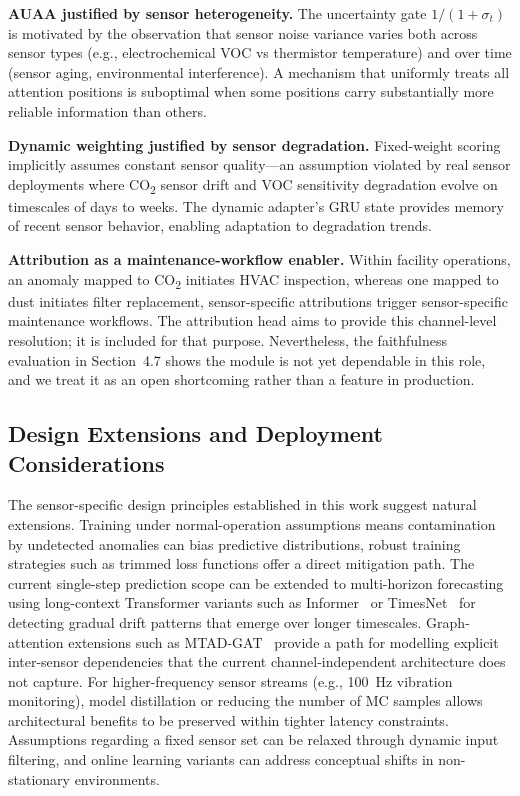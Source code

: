 \textbf{AUAA justified by sensor heterogeneity.} The uncertainty gate $1/(1 + \sigma_t)$ is motivated by the observation that sensor noise variance varies both across sensor types (e.g., electrochemical VOC vs thermistor temperature) and over time (sensor aging, environmental interference). A mechanism that uniformly treats all attention positions is suboptimal when some positions carry substantially more reliable information than others.

\textbf{Dynamic weighting justified by sensor degradation.} Fixed-weight scoring implicitly assumes constant sensor quality—an assumption violated by real sensor deployments where CO\textsubscript{2} sensor drift and VOC sensitivity degradation evolve on timescales of days to weeks. The dynamic adapter's GRU state provides memory of recent sensor behavior, enabling adaptation to degradation trends.

\textbf{Attribution as a maintenance-workflow enabler.} Within facility operations, an anomaly mapped to CO\textsubscript{2} initiates HVAC inspection, whereas one mapped to dust initiates filter replacement, sensor-specific attributions trigger sensor-specific maintenance workflows. The attribution head aims to provide this channel-level resolution; it is included for that purpose. Nevertheless, the faithfulness evaluation in Section~4.7 shows the module is not yet dependable in this role, and we treat it as an open shortcoming rather than a feature in production. 

\subsection{Design Extensions and Deployment Considerations}

The sensor-specific design principles established in this work suggest natural extensions. Training under normal-operation assumptions means contamination by undetected anomalies can bias predictive distributions, robust training strategies such as trimmed loss functions offer a direct mitigation path. The current single-step prediction scope can be extended to multi-horizon forecasting using long-context Transformer variants such as Informer~\cite{zhou2021informer} or TimesNet~\cite{wu2022timesnet} for detecting gradual drift patterns that emerge over longer timescales. Graph-attention extensions such as MTAD-GAT~\cite{zhao2020mtadgat} provide a path for modelling explicit inter-sensor dependencies that the current channel-independent architecture does not capture. For higher-frequency sensor streams (e.g., 100~Hz vibration monitoring), model distillation or reducing the number of MC samples allows architectural benefits to be preserved within tighter latency constraints. Assumptions regarding a fixed sensor set can be relaxed through dynamic input filtering, and online learning variants can address conceptual shifts in non-stationary environments.

